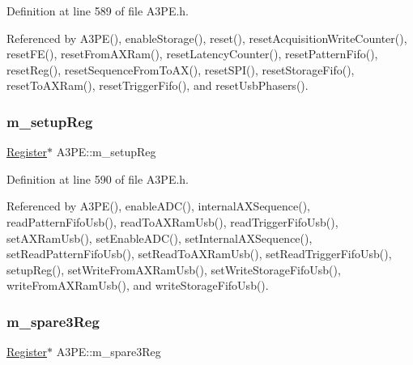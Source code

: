 Definition at line 589 of file A3\+P\+E.\+h.



Referenced by A3\+P\+E(), enable\+Storage(), reset(), reset\+Acquisition\+Write\+Counter(), reset\+F\+E(), reset\+From\+A\+X\+Ram(), reset\+Latency\+Counter(), reset\+Pattern\+Fifo(), reset\+Reg(), reset\+Sequence\+From\+To\+A\+X(), reset\+S\+P\+I(), reset\+Storage\+Fifo(), reset\+To\+A\+X\+Ram(), reset\+Trigger\+Fifo(), and reset\+Usb\+Phasers().

\mbox{\label{classA3PE_a142fa10b7e705c4701ae21678ec2ec8a}} 
\subsubsection{\texorpdfstring{m\+\_\+setup\+Reg}{m\_setupReg}}
{\footnotesize\ttfamily \hyperlink{classRegister}{Register}$\ast$ A3\+P\+E\+::m\+\_\+setup\+Reg\hspace{0.3cm}{\ttfamily [private]}}



Definition at line 590 of file A3\+P\+E.\+h.



Referenced by A3\+P\+E(), enable\+A\+D\+C(), internal\+A\+X\+Sequence(), read\+Pattern\+Fifo\+Usb(), read\+To\+A\+X\+Ram\+Usb(), read\+Trigger\+Fifo\+Usb(), set\+A\+X\+Ram\+Usb(), set\+Enable\+A\+D\+C(), set\+Internal\+A\+X\+Sequence(), set\+Read\+Pattern\+Fifo\+Usb(), set\+Read\+To\+A\+X\+Ram\+Usb(), set\+Read\+Trigger\+Fifo\+Usb(), setup\+Reg(), set\+Write\+From\+A\+X\+Ram\+Usb(), set\+Write\+Storage\+Fifo\+Usb(), write\+From\+A\+X\+Ram\+Usb(), and write\+Storage\+Fifo\+Usb().

\mbox{\label{classA3PE_a1e7e5c89f190672990ae5bece2a8b1aa}} 
\subsubsection{\texorpdfstring{m\+\_\+spare3\+Reg}{m\_spare3Reg}}
{\footnotesize\ttfamily \hyperlink{classRegister}{Register}$\ast$ A3\+P\+E\+::m\+\_\+spare3\+Reg\hspace{0.3cm}{\ttfamily [private]}}



